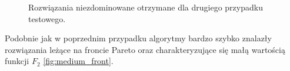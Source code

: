 \documentclass[twoside]{iisthesis}
\begin{document}
\begin{figure}\centering
{}
    \hfill
{}
    \hfill
{}
\caption{Rozwiązania niezdominowane otrzymane dla drugiego przypadku testowego.}
    \label{fig:medium_front}
\end{figure}
Podobnie jak w poprzednim przypadku algorytmy bardzo szybko znalazły rozwiązania leżące na froncie Pareto oraz charakteryzujące się małą wartością funkcji $F_{2}$ \eqref{fig:medium_front}.
\end{document}
